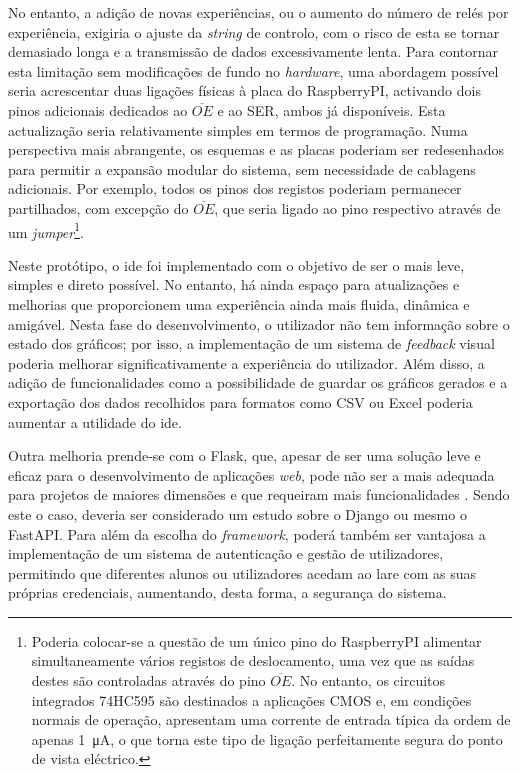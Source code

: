 No entanto, a adição de novas experiências, ou o aumento do número de relés por experiência, exigiria o ajuste da \textit{string} de controlo, com o risco de esta se tornar demasiado longa e a transmissão de dados excessivamente lenta. Para contornar esta limitação sem modificações de fundo no \textit{hardware}, uma abordagem possível seria acrescentar duas ligações físicas à placa do \gls{RaspberryPI}, activando dois pinos adicionais dedicados ao $\overline{OE}$ e ao SER, ambos já disponíveis. Esta actualização seria relativamente simples em termos de programação. Numa perspectiva mais abrangente, os esquemas e as placas poderiam ser redesenhados para permitir a expansão modular do sistema, sem necessidade de cablagens adicionais. Por exemplo, todos os pinos dos registos poderiam permanecer partilhados, com excepção do $\overline{OE}$, que seria ligado ao pino respectivo através de um \textit{jumper}\footnote{Poderia colocar-se a questão de um único pino do \gls{RaspberryPI} alimentar simultaneamente vários registos de deslocamento, uma vez que as saídas destes são controladas através do pino $\overline{OE}$. No entanto, os circuitos integrados 74HC595 são destinados a aplicações CMOS e, em condições normais de operação, apresentam uma corrente de entrada típica da ordem de apenas \SI{1}{\micro\ampere}\cite{SN74HC595}, o que torna este tipo de ligação perfeitamente segura do ponto de vista eléctrico.}. 

Neste protótipo, o \acrshort{ide} foi implementado com o objetivo de ser o mais leve, simples e direto possível. No entanto, há ainda espaço para atualizações e melhorias que proporcionem uma experiência ainda mais fluida, dinâmica e amigável. Nesta fase do desenvolvimento, o utilizador não tem informação sobre o estado dos gráficos; por isso, a implementação de um sistema de \textit{feedback} visual poderia melhorar significativamente a experiência do utilizador. Além disso, a adição de funcionalidades como a possibilidade de guardar os gráficos gerados e a exportação dos dados recolhidos para formatos como CSV ou Excel poderia aumentar a utilidade do \acrshort{ide}.

Outra melhoria prende-se com o Flask, que, apesar de ser uma solução leve e eficaz para o desenvolvimento de aplicações \textit{web}, pode não ser a mais adequada para projetos de maiores dimensões e que requeiram mais funcionalidades \cite{FlaskvsDjango, Djangovsflask}. Sendo este o caso, deveria ser considerado um estudo sobre o Django ou mesmo o FastAPI. Para além da escolha do \textit{framework}, poderá também ser vantajosa a implementação de um sistema de autenticação e gestão de utilizadores, permitindo que diferentes alunos ou utilizadores acedam ao \acrshort{lare} com as suas próprias credenciais, aumentando, desta forma, a segurança do sistema.
